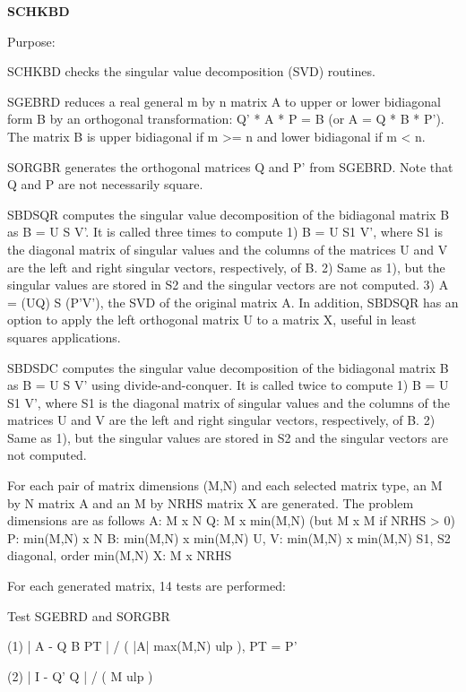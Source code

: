 {\bfseries S\+C\+H\+K\+B\+D} 

\begin{DoxyParagraph}{Purpose\+: }
\begin{DoxyVerb} SCHKBD checks the singular value decomposition (SVD) routines.

 SGEBRD reduces a real general m by n matrix A to upper or lower
 bidiagonal form B by an orthogonal transformation:  Q' * A * P = B
 (or A = Q * B * P').  The matrix B is upper bidiagonal if m >= n
 and lower bidiagonal if m < n.

 SORGBR generates the orthogonal matrices Q and P' from SGEBRD.
 Note that Q and P are not necessarily square.

 SBDSQR computes the singular value decomposition of the bidiagonal
 matrix B as B = U S V'.  It is called three times to compute
    1)  B = U S1 V', where S1 is the diagonal matrix of singular
        values and the columns of the matrices U and V are the left
        and right singular vectors, respectively, of B.
    2)  Same as 1), but the singular values are stored in S2 and the
        singular vectors are not computed.
    3)  A = (UQ) S (P'V'), the SVD of the original matrix A.
 In addition, SBDSQR has an option to apply the left orthogonal matrix
 U to a matrix X, useful in least squares applications.

 SBDSDC computes the singular value decomposition of the bidiagonal
 matrix B as B = U S V' using divide-and-conquer. It is called twice
 to compute
    1) B = U S1 V', where S1 is the diagonal matrix of singular
        values and the columns of the matrices U and V are the left
        and right singular vectors, respectively, of B.
    2) Same as 1), but the singular values are stored in S2 and the
        singular vectors are not computed.

 For each pair of matrix dimensions (M,N) and each selected matrix
 type, an M by N matrix A and an M by NRHS matrix X are generated.
 The problem dimensions are as follows
    A:          M x N
    Q:          M x min(M,N) (but M x M if NRHS > 0)
    P:          min(M,N) x N
    B:          min(M,N) x min(M,N)
    U, V:       min(M,N) x min(M,N)
    S1, S2      diagonal, order min(M,N)
    X:          M x NRHS

 For each generated matrix, 14 tests are performed:

 Test SGEBRD and SORGBR

 (1)   | A - Q B PT | / ( |A| max(M,N) ulp ), PT = P'

 (2)   | I - Q' Q | / ( M ulp )


\end{DoxyVerb}
\end{DoxyParagraph}
